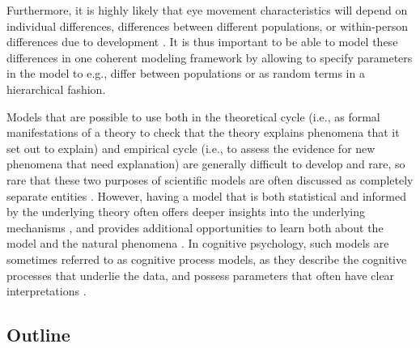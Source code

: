 \documentclass{article}
\begin{document}
Furthermore, it is highly likely that eye movement characteristics will depend on individual differences, differences between different populations, or within-person differences due to development \citep{de2019individual}. It is thus important to be able to model these differences in one coherent modeling framework by allowing to specify parameters in the model to e.g., differ between populations or as random terms in a hierarchical fashion.

Models that are possible to use both in the theoretical cycle (i.e., as formal manifestations of a theory to check that the theory explains phenomena that it set out to explain) and empirical cycle (i.e., to assess the evidence for new phenomena that need explanation) are generally difficult to develop and rare, so rare that these two purposes of scientific models are often discussed as completely separate entities \citep{smaldino2017models}. However, having a model that is both statistical and informed by the underlying theory often offers deeper insights into the underlying mechanisms \citep{rodgers2010epistemology,borsboom2020theory}, and provides additional opportunities to learn both about the model and the natural phenomena \citep[][pp. 525--552]{mcelreath2020statistical}. In cognitive psychology, such models are sometimes referred to as cognitive process models, as they describe the cognitive processes that underlie the data, and possess parameters that often have clear interpretations \citep{forstmann2015introduction}.


\subsection{Outline}
\end{document}
